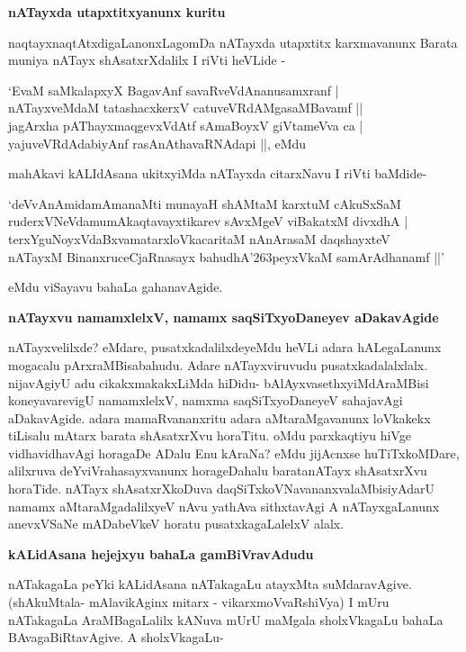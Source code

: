 {\bf nATayxda utapxtitxyanunx kuritu}

naqtayxnaqtAtxdigaLanonxLagomDa nATayxda utapxtitx karxmavanunx Barata muniya nATayx shAsatxrXdalilx I riVti heVLide -

\begin{shloka}
`EvaM saMkalapxyX BagavAnf savaRveVdAnanusamxranf |\\
nATayxveMdaM tatashacxkerxV catuveVRdAMgasaMBavamf ||\\
jagArxha pAThayxmaqgevxVdAtf sAmaBoyxV giVtameVva ca |\\
yajuveVRdAdabiyAnf rasAnAthavaRNAdapi ||, eMdu
\end{shloka}

mahAkavi kALIdAsana ukitxyiMda nATayxda citarxNavu I riVti baMdide-

\begin{shloka}
`deVvAnAmidamAmanaMti munayaH shAMtaM karxtuM cAkuSxSaM\\
ruderxVNeVdamumAkaqtavayxtikarev sAvxMgeV viBakatxM divxdhA |\\
terxYguNoyxVdaBxvamatarxloVkacaritaM nAnArasaM daqshayxteV\\
nATayxM BinanxruceCjaRnasayx bahudhA\char'263peyxVkaM samArAdhanamf ||'
\end{shloka}

eMdu viSayavu bahaLa gahanavAgide.

{\bf nATayxvu namamxlelxV, namamx saqSiTxyoDaneyev aDakavAgide}

nATayxvelilxde? eMdare, pusatxkadalilxdeyeMdu heVLi adara hALegaLanunx mogacalu pArxraMBisabahudu. Adare nATayxviruvudu pusatxkadalalxlalx. nijavAgiyU adu cikakxmakakxLiMda hiDidu- bAlAyxvasethxyiMdAraMBisi koneyavarevigU namamxlelxV, namxma saqSiTxyoDaneyeV sahajavAgi aDakavAgide. adara mamaRvananxritu adara aMtaraMgavanunx loVkakekx tiLisalu mAtarx barata shAsatxrXvu horaTitu. oMdu parxkaqtiyu hiVge vidhavidhavAgi horagaDe ADalu Enu kAraNa? eMdu jijAcnxse huTiTxkoMDare, alilxruva deYviVrahasayxvanunx horageDahalu baratanATayx shAsatxrXvu horaTide. nATayx shAsatxrXkoDuva daqSiTxkoVNavananxvalaMbisiyAdarU namamx aMtaraMgadalilxyeV nAvu yathAva sithxtavAgi A nATayxgaLanunx anevxVSaNe mADabeVkeV horatu pusatxkagaLalelxV alalx.

{\bf kALidAsana hejejxyu bahaLa gamBiVravAdudu}

nATakagaLa peYki kALidAsana nATakagaLu atayxMta suMdaravAgive. (shAkuMtala- mAlavikAginx mitarx - vikarxmoVvaRshiVya) I mUru nATakagaLa AraMBagaLalilx kANuva mUrU maMgala sholxVkagaLu bahaLa BAvagaBiRtavAgive. A sholxVkagaLu-

